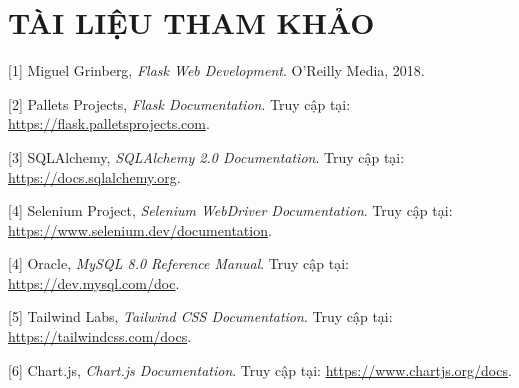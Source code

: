 \documentclass[13pt,a4paper]{extreport}
\begin{document}
\clearpage
\chapter*{TÀI LIỆU THAM KHẢO}

[1] Miguel Grinberg, \emph{Flask Web Development}. O'Reilly Media, 2018.
 
[2] Pallets Projects, \emph{Flask Documentation}.  
Truy cập tại: \href{https://flask.palletsprojects.com}{https://flask.palletsprojects.com}.
 
[3] SQLAlchemy, \emph{SQLAlchemy 2.0 Documentation}.  
Truy cập tại: \href{https://docs.sqlalchemy.org}{https://docs.sqlalchemy.org}.
 
[4] Selenium Project, \emph{Selenium WebDriver Documentation}.  
Truy cập tại: \href{https://www.selenium.dev/documentation}{https://www.selenium.dev/documentation}.
 
[4] Oracle, \emph{MySQL 8.0 Reference Manual}.  
Truy cập tại: \href{https://dev.mysql.com/doc}{https://dev.mysql.com/doc}.
 
[5] Tailwind Labs, \emph{Tailwind CSS Documentation}.  
Truy cập tại: \href{https://tailwindcss.com/docs}{https://tailwindcss.com/docs}.
 
[6] Chart.js, \emph{Chart.js Documentation}.  
Truy cập tại: \href{https://www.chartjs.org/docs}{https://www.chartjs.org/docs}.
 
\end{document}
